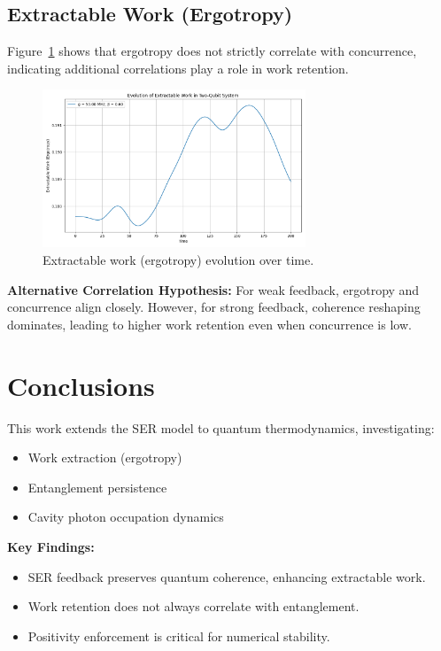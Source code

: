 \documentclass[12pt]{article}
\begin{document}
\subsection{Extractable Work (Ergotropy)}
Figure~\ref{fig:ergotropy} shows that ergotropy does not strictly correlate with concurrence, indicating additional correlations play a role in work retention.

\begin{figure}[h]
    \centering
    \includegraphics[width=0.7\textwidth]{Figure2.png}
    \caption{Extractable work (ergotropy) evolution over time.}
    \label{fig:ergotropy}
\end{figure}

\textbf{Alternative Correlation Hypothesis:}  
For weak feedback, ergotropy and concurrence align closely. However, for strong feedback, coherence reshaping dominates, leading to higher work retention even when concurrence is low.

\section{Conclusions}

This work extends the SER model to quantum thermodynamics, investigating:
\begin{itemize}
    \item Work extraction (ergotropy)
    \item Entanglement persistence
    \item Cavity photon occupation dynamics
\end{itemize}

\textbf{Key Findings:}
\begin{itemize}
    \item SER feedback preserves quantum coherence, enhancing extractable work.
    \item Work retention does not always correlate with entanglement.
    \item Positivity enforcement is critical for numerical stability.
\end{itemize}
\end{document}
